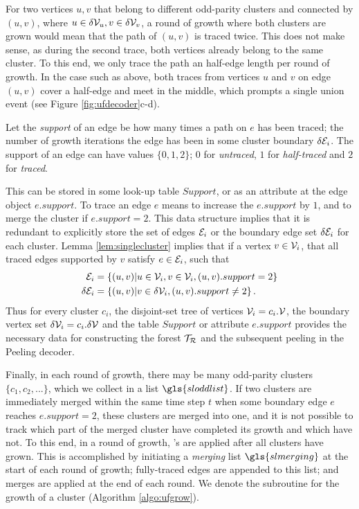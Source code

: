 For two vertices $u,v$ that belong to different odd-parity clusters and connected by $(u,v)$, where $u \in \delta \mathcal{V}_u, v \in \delta \mathcal{V}_v$, a round of growth where both clusters are grown would mean that the path of $(u,v)$ is traced twice. This does not make sense, as during the second trace, both vertices already belong to the same cluster. To this end, we only trace the path an half-edge length per round of growth. In the case such as above, both traces from vertices $u$ and $v$ on edge $(u,v)$ cover a half-edge and meet in the middle, which prompts a single union event (see Figure \ref{fig:ufdecoder}c-d). 
\begin{definition}\label{def:support}
  Let the \emph{support} of an edge be how many times a path on $e$ has been traced; the number of growth iterations the edge has been in some cluster boundary $\delta\mathcal{E}_i$. The support of an edge can have values $\{0,1,2\}$; $0$ for \emph{untraced}, $1$ for \emph{half-traced} and $2$ for \emph{traced}.
\end{definition}
This can be stored in some look-up table $Support$, or as an attribute at the edge object $e.support$. To trace an edge $e$ means to increase the $e.support$ by $1$, and to merge the cluster if $e.support=2$. This data structure implies that it is redundant to explicitly store the set of edges $\mathcal{E}_i$ or the boundary edge set $\delta \mathcal{E}_i$ for each cluster. Lemma \ref{lem:singlecluster} implies that if a vertex $v\in \mathcal{V}_i$, that all traced edges supported by $v$ satisfy $e \in \mathcal{E}_i$, such that
\begin{align}
  \mathcal{E}_i &= \left\{(u,v)|u\in \mathcal{V}_i, v \in \mathcal{V}_i, (u,v).support=2\right\}\\
  \delta \mathcal{E}_i &= \left\{(u,v)| v \in \delta \mathcal{V}_i, (u,v).support \neq 2\right\}.
\end{align}
Thus for every cluster $c_i$, the disjoint-set tree of vertices $\mathcal{V}_i=c_i.\mathcal{V}$, the boundary vertex set $\delta \mathcal{V}_i=c_i.\delta \mathcal{V}$ and the table $Support$ or attribute $e.support$ provides the necessary data for constructing the forest $\mathcal{T}_{\mathcal{R}}$ and the subsequent peeling in the Peeling decoder.

Finally, in each round of growth, there may be many odd-parity clusters $\{c_{1}, c_{2},...\}$, which we collect in a list $\gls{sloddlist}$. If two clusters are immediately merged within the same time step $t$ when some boundary edge $e$ reaches $e.support=2$, these clusters are merged into one, and it is not possible to track which part of the merged cluster have completed its growth and which have not. To this end, in a round of growth, 's are applied after all clusters have grown. This is accomplished by initiating a \emph{merging} list $\gls{slmerging}$ at the start of each round of growth; fully-traced edges are appended to this list; and merges are applied at the end of each round. We denote the subroutine for the growth of a cluster  (Algorithm \ref{algo:ufgrow}).

